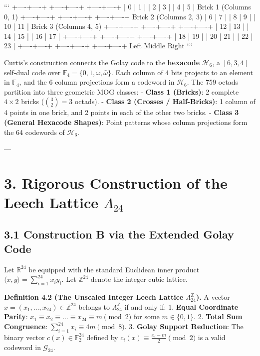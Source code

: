 \documentclass[11pt,twoside,openright]{amsbook}
\begin{document}
```
       +----+----+  +----+----+  +----+----+
       |  0 |  1 |  |  2 |  3 |  |  4 |  5 |   Brick 1 (Columns 0, 1)
       +----+----+  +----+----+  +----+----+   Brick 2 (Columns 2, 3)
       |  6 |  7 |  |  8 |  9 |  | 10 | 11 |   Brick 3 (Columns 4, 5)
       +----+----+  +----+----+  +----+----+
       | 12 | 13 |  | 14 | 15 |  | 16 | 17 |
       +----+----+  +----+----+  +----+----+
       | 18 | 19 |  | 20 | 21 |  | 22 | 23 |
       +----+----+  +----+----+  +----+----+
          Left         Middle        Right
```

Curtis's construction connects the Golay code to the \textbf{hexacode} $\mathcal{H}_6$, a $[6, 3, 4]$ self-dual code over $\mathbb{F}_4 = \{0, 1, \omega, \bar{\omega}\}$.
Each column of 4 bits projects to an element in $\mathbb{F}_4$, and the 6 column projections form a codeword in $\mathcal{H}_6$.
The 759 octads partition into three geometric MOG classes:
- \textbf{Class 1 (Bricks)}: 2 complete $4 \times 2$ bricks ($\binom{3}{2} = 3$ octads).
- \textbf{Class 2 (Crosses / Half-Bricks)}: 1 column of 4 points in one brick, and 2 points in each of the other two bricks.
- \textbf{Class 3 (General Hexacode Shapes)}: Point patterns whose column projections form the 64 codewords of $\mathcal{H}_6$.

---

\section{3. Rigorous Construction of the Leech Lattice $\Lambda_{24}$}

\subsection{3.1 Construction B via the Extended Golay Code}

Let $\mathbb{R}^{24}$ be equipped with the standard Euclidean inner product $\langle x, y \rangle = \sum_{i=1}^{24} x_i y_i$. Let $\mathbb{Z}^{24}$ denote the integer cubic lattice.

\textbf{Definition 4.2 (The Unscaled Integer Leech Lattice $\Lambda_{24}^{\mathbb{Z}}$).}
A vector $x = (x_1, \dots, x_{24}) \in \mathbb{Z}^{24}$ belongs to $\Lambda_{24}^{\mathbb{Z}}$ if and only if:
1. \textbf{Equal Coordinate Parity}: $x_1 \equiv x_2 \equiv \dots \equiv x_{24} \equiv m \pmod 2$ for some $m \in \{0, 1\}$.
2. \textbf{Total Sum Congruence}: $\sum_{i=1}^{24} x_i \equiv 4m \pmod 8$.
3. \textbf{Golay Support Reduction}: The binary vector $c(x) \in \mathbb{F}_2^{24}$ defined by $c_i(x) \equiv \frac{x_i - m}{2} \pmod 2$ is a valid codeword in $\mathcal{G}_{24}$.
\end{document}

